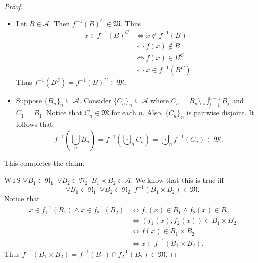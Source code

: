 \documentclass[notoc,notitlepage]{tufte-book}
\begin{document}
\begin{proof}
  \noindent
  \begin{itemize}
    \item Let $B \in \mathcal{A}$. Then $f^{-1}(B)^C \in \mathfrak{M}$.
      Thus
      \begin{align*}
        x \in f^{-1}(B)^C
        &\iff x \notin f^{-1}(B) \\
        &\iff f(x) \notin B \\
        &\iff f(x) \in B^C \\
        &\iff x \in f^{-1}(B^C).
      \end{align*}
      Thus $f^{-1}(B^C) = f^{-1}(B)^C \in \mathfrak{M}$.
    \item Suppose $\{ B_n \}_n \subseteq \mathcal{A}$.
      Consider $\{ C_n \}_n \subseteq \mathcal{A}$
      where $C_n = B_n \setminus \bigcup_{j=1}^{n-1} B_j$ and $C_1 = B_1$.
      Notice that $C_n \in \mathfrak{M}$ for each $n$.
      Also, $\{ C_n \}_n$ is pairwise disjoint.
      It follows that
      \begin{equation*}
        f^{-1} \left( \bigcup_{n} B_n \right)
        = f^{-1} \left( \bigcupdot_{n} C_n \right)
        = \bigcupdot_{n} f^{-1}(C_n) \in \mathfrak{M}.
      \end{equation*}
  \end{itemize}
  This completes the claim.

  \noindent
  WTS $\forall B_1 \in \mathfrak{N}_1 \enspace \forall B_2 \in \mathfrak{N}_2
  \enspace B_1 \times B_2 \in \mathcal{A}$.
  We know that this is true iff
  \begin{equation*}
    \forall B_1 \in \mathfrak{N}_1 \enspace\forall B_2 \in \mathfrak{N}_2
    \enspace f^{-1}(B_1 \times B_2) \in \mathfrak{M}.
  \end{equation*}
  Notice that
  \begin{align*}
    x \in f_1^{-1}(B_1) \land x \in f_2^{-1}(B_2)
    &\iff f_1(x) \in B_1 \land f_2(x) \in B_2 \\
    &\iff (f_1(x), f_2(x)) \in B_1 \times B_2 \\
    &\iff f(x) \in B_1 \times B_2 \\
    &\iff x \in f^{-1}(B_1 \times B_2).
  \end{align*}
  Thus $f^{-1}(B_1 \times B_2) = f_1^{-1}(B_1) \cap f_2^{-1}(B_2) \in
  \mathfrak{M}$.
\end{proof}

\end{document}
